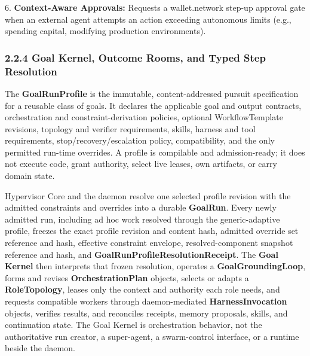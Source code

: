\documentclass[
  11pt,
]{article}
\begin{document}
6. \textbf{Context-Aware Approvals:} Requests a wallet.network step-up
approval gate when an external agent attempts an action exceeding
autonomous limits (e.g., spending capital, modifying production
environments).

\hypertarget{goal-kernel-and-typed-step-resolution}{%
\subsubsection{2.2.4 Goal Kernel, Outcome Rooms, and Typed Step
Resolution}\label{goal-kernel-and-typed-step-resolution}}

The \textbf{GoalRunProfile} is the immutable, content-addressed pursuit
specification for a reusable class of goals. It declares the applicable goal and
output contracts, orchestration and constraint-derivation policies, optional
WorkflowTemplate revisions, topology and verifier requirements, skills, harness
and tool requirements, stop/recovery/escalation policy, compatibility, and the
only permitted run-time overrides. A profile is compilable and admission-ready;
it does not execute code, grant authority, select live leases, own artifacts, or
carry domain state.

Hypervisor Core and the daemon resolve one selected profile revision with the
admitted constraints and overrides into a durable \textbf{GoalRun}. Every newly
admitted run, including ad hoc work resolved through the generic-adaptive
profile, freezes the exact profile revision and content hash, admitted override
set reference and hash, effective constraint envelope, resolved-component
snapshot reference and hash, and \textbf{GoalRunProfileResolutionReceipt}. The
\textbf{Goal Kernel} then interprets that frozen resolution, operates a
\textbf{GoalGroundingLoop}, forms and revises
\textbf{OrchestrationPlan} objects, selects or adapts a
\textbf{RoleTopology}, leases only the context and authority each role needs,
and requests compatible workers through daemon-mediated
\textbf{HarnessInvocation} objects,
verifies results, and reconciles
receipts, memory proposals, skills, and continuation state. The Goal Kernel is
orchestration behavior, not the authoritative run creator, a super-agent, a
swarm-control interface, or a runtime beside the daemon.
\end{document}
